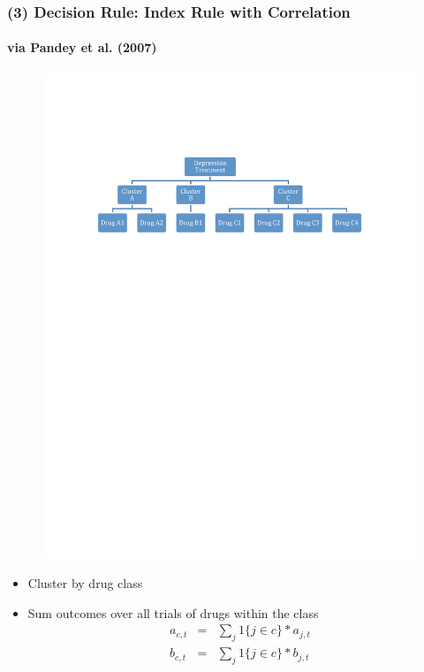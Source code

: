 \documentclass[xcolor=pdftex,dvipsnames,table,mathserif,aspectratio=169]{beamer}
\begin{document}
\begin{frame}
\frametitle{(3) Decision Rule: Index Rule with Correlation} %
\framesubtitle{via Pandey et al. (2007)}

\begin{figure}[h!]
\centering\includegraphics[width=1\linewidth]{./resources/drug_hierarchy.pdf}
\end{figure}

\begin{itemize}
\item Cluster by drug class

\item Sum outcomes over all trials of drugs within the class 
\begin{eqnarray*}
a_{c,t} &=&\sum_{j}1\{j\in c\} \ast a_{j,t} \\
b_{c,t} &=&\sum_{j}1\{j\in c\} \ast b_{j,t}
\end{eqnarray*}
\end{itemize}
\end{frame}
\end{document}
